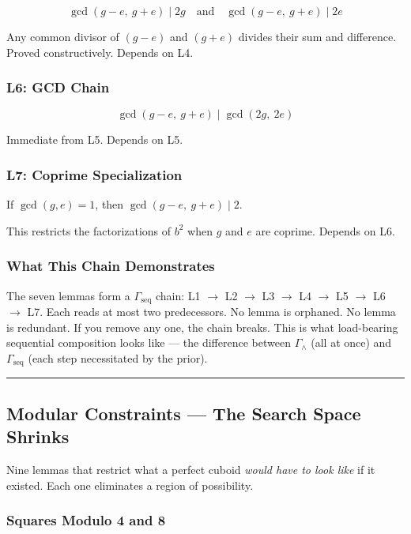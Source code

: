 \documentclass[12pt,a4paper]{article}
\begin{document}
\[\gcd(g-e,\ g+e) \mid 2g \quad\text{and}\quad \gcd(g-e,\ g+e) \mid 2e\]

Any common divisor of $(g-e)$ and $(g+e)$ divides their sum and difference. Proved constructively. Depends on L4.

\subsubsection{L6: GCD Chain}

\[\gcd(g-e,\ g+e) \mid \gcd(2g,\ 2e)\]

Immediate from L5. Depends on L5.

\subsubsection{L7: Coprime Specialization}

If $\gcd(g, e) = 1$, then $\gcd(g-e,\ g+e) \mid 2$.

This restricts the factorizations of $b^2$ when $g$ and $e$ are coprime. Depends on L6.

\subsubsection{What This Chain Demonstrates}

The seven lemmas form a $\Gamma_\text{seq}$ chain: L1 $\rightarrow$ L2 $\rightarrow$ L3 $\rightarrow$ L4 $\rightarrow$ L5 $\rightarrow$ L6 $\rightarrow$ L7. Each reads at most two predecessors. No lemma is orphaned. No lemma is redundant. If you remove any one, the chain breaks. This is what load-bearing sequential composition looks like --- the difference between $\Gamma_{\wedge}$ (all at once) and $\Gamma_\text{seq}$ (each step necessitated by the prior).

\begin{center}
\rule{0.5\textwidth}{0.4pt}
\end{center}

\subsection{Modular Constraints --- The Search Space Shrinks}

Nine lemmas that restrict what a perfect cuboid \emph{would have to look like} if it existed. Each one eliminates a region of possibility.

\subsubsection{Squares Modulo 4 and 8}
\end{document}
